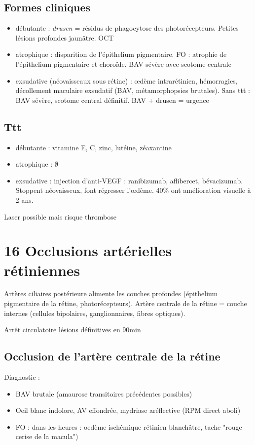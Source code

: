 \documentclass[11pt]{article}
\begin{document}
\subsection{Formes cliniques}
\label{sec:org2d774e2}
\begin{itemize}
\item débutante : \emph{drusen} = résidus de phagocytose des photorécepteurs. Petites
lésions profondes jaunâtre. OCT
\item atrophique : disparition de l'épithelium pigmentaire. FO : atrophie de
l'épithelium pigmentaire et choroïde. BAV sévère avec scotome centrale
\item exsudative (néovaisseaux sous rétine) : \oe{}dème intrarétinien, hémorragies,
décollement maculaire exsudatif (BAV, métamorphopsies brutales). Sans ttt :
BAV sévère, scotome central définitif. BAV + drusen = urgence \faBomb
\end{itemize}

\subsection{Ttt}
\label{sec:orgd614e37}
\begin{itemize}
\item débutante : vitamine E, C, zinc, lutéine, zéaxantine
\item atrophique : \(\emptyset\)
\item exsudative : injection d'anti-VEGF : ranibizumab, 
aflibercet, bévacizumab. Stoppent néovaisseux, font régresser l'\oe{}dème. 40\%
ont amélioration visuelle à 2 ans.
\end{itemize}
Laser possible mais risque thrombose
\section{16 Occlusions artérielles rétiniennes}
\label{sec:orgf1904fd}
Artères ciliaires postérieure alimente les couches profondes (épithelium
pigmentaire de la rétine, photorécepteurs). 
Artère centrale de la rétine = couche internes (cellules bipolaires,
ganglionnaires, fibres optiques).

Arrêt circulatoire \thus lésions définitives en 90min \danger

\subsection{Occlusion de l'artère centrale de la rétine}
\label{sec:org767be22}
Diagnostic : 
\begin{itemize}
\item BAV brutale (amaurose transitoires précédentes possibles)
\item Oeil blanc indolore, AV effondrée, mydriase aréflective (RPM direct aboli)
\item FO : dans les heures : oedème ischémique rétinien blanchâtre, tache "rouge
cerise de la macula")
\end{itemize}
\end{document}
